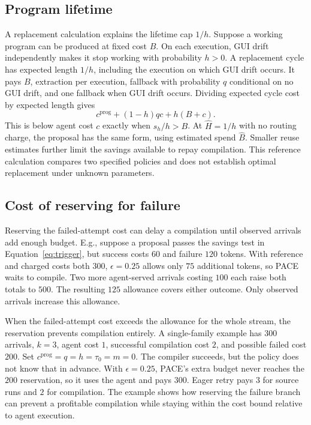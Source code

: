 \subsection{Program lifetime}
\label{sec:program-lifetime}
A replacement calculation explains the lifetime cap $1/h$.
Suppose a working program can be produced at fixed cost $B$.
On each execution, GUI drift independently makes it stop working with probability $h>0$.
A replacement cycle has expected length $1/h$, including the execution on which GUI drift occurs.
It pays $B$, extraction per execution, fallback with probability $q$ conditional on no GUI drift, and one fallback when GUI drift occurs.
Dividing expected cycle cost by expected length gives
\begin{equation}
c^{\mathrm{prog}}+(1-h)qc+h(B+c).
\label{eq:replacement}
\end{equation}
This is below agent cost $c$ exactly when $s_h/h>B$.
At $\hat H=1/h$ with no routing charge, the proposal has the same form, using estimated spend $\hat B$.
Smaller reuse estimates further limit the savings available to repay compilation.
This reference calculation compares two specified policies and does not establish optimal replacement under unknown parameters.

\subsection{Cost of reserving for failure}
\label{app:reservation-example}
Reserving the failed-attempt cost can delay a compilation until observed arrivals add enough budget.
E.g., suppose a proposal passes the savings test in Equation~\ref{eq:trigger}, but success costs $60$ and failure $120$ tokens.
With reference and charged costs both $300$, $\epsilon=0.25$ allows only $75$ additional tokens, so PACE waits to compile.
Two more agent-served arrivals costing $100$ each raise both totals to $500$.
The resulting $125$ allowance covers either outcome.
Only observed arrivals increase this allowance.

When the failed-attempt cost exceeds the allowance for the whole stream, the reservation prevents compilation entirely.
A single-family example has $300$ arrivals, $k=3$, agent cost $1$, successful compilation cost $2$, and possible failed cost $200$.
Set $c^{\mathrm{prog}}=q=h=\tau_0=m=0$.
The compiler succeeds, but the policy does not know that in advance.
With $\epsilon=0.25$, PACE's extra budget never reaches the $200$ reservation, so it uses the agent and pays $300$.
Eager retry pays $3$ for source runs and $2$ for compilation.
The example shows how reserving the failure branch can prevent a profitable compilation while staying within the cost bound relative to agent execution.
